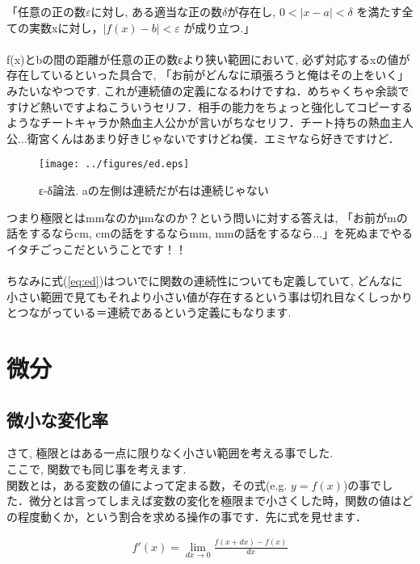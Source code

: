 \documentclass[11pt,a4paper]{ujreport}
\begin{document}
  「任意の正の数$\varepsilon $に対し, ある適当な正の数$\delta$が存在し, $0<|x-a|<\delta$ を満たす全ての実数xに対し，$|f(x)-b|<\varepsilon$ が成り立つ.」\\
\\

f(x)とbの間の距離が任意の正の数εより狭い範囲において, 必ず対応するxの値が存在しているといった具合で, 「お前がどんなに頑張ろうと俺はその上をいく」みたいなやつです. これが連続値の定義になるわけですね．めちゃくちゃ余談ですけど熱いですよねこういうセリフ．相手の能力をちょっと強化してコピーするようなチートキャラか熱血主人公かが言いがちなセリフ．チート持ちの熱血主人公...衛宮くんはあまり好きじゃないですけどね僕．エミヤなら好きですけど．

\begin{figure}[H]
\label{im:ed}
  \centering
  \texttt{[image: ../figures/ed.eps]}
  \caption{ε-δ論法. aの左側は連続だが右は連続じゃない}
\end{figure}

つまり極限とはmmなのかμmなのか？という問いに対する答えは, 「お前がmの話をするならcm, cmの話をするならmm, mmの話をするなら...」を死ぬまでやるイタチごっこだということです！！\\
\\

ちなみに式(\ref{eq:ed})はついでに関数の連続性についても定義していて, どんなに小さい範囲で見てもそれより小さい値が存在するという事は切れ目なくしっかりとつながっている＝連続であるという定義にもなります.\\
\section{微分}
\subsection{微小な変化率}
さて, 極限とはある一点に限りなく小さい範囲を考える事でした.\\
ここで, 関数でも同じ事を考えます.\\

関数とは，ある変数の値によって定まる数，その式(e.g. $y = f(x)$)の事でした．微分とは言ってしまえば変数の変化を極限まで小さくした時，関数の値はどの程度動くか，という割合を求める操作の事です．先に式を見せます．

\begin{eqnarray}
\label{eq:prime}
f'(x) =\lim_{dx \rightarrow 0} \frac{f(x+dx) - f(x)}{dx}
\end{eqnarray}
\end{document}
